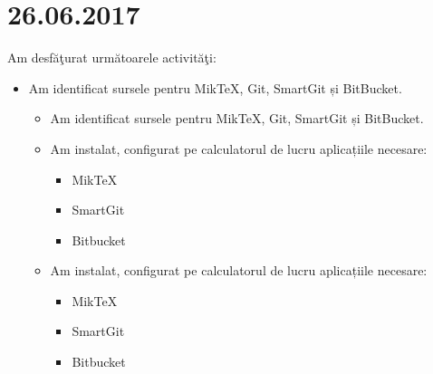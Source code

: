 \documentclass{report}
\begin{document}
\chapter{26.06.2017}

Am desfăţurat următoarele activităţi:

\begin{itemize}

\item

Am identificat sursele pentru MikTeX, Git, SmartGit și BitBucket.

\begin{itemize}

\item

Am identificat sursele pentru MikTeX, Git, SmartGit și BitBucket.

\item

Am instalat, configurat pe calculatorul de lucru aplicațiile necesare:

\begin{itemize}

\item

MikTeX

\item

SmartGit

\item

Bitbucket

\end{itemize}

\item

Am instalat, configurat pe calculatorul de lucru aplicațiile necesare:

\begin{itemize}

\item

MikTeX

\item

SmartGit

\item

Bitbucket

\end{itemize}



\end{itemize}

\end{itemize}
\end{document}
